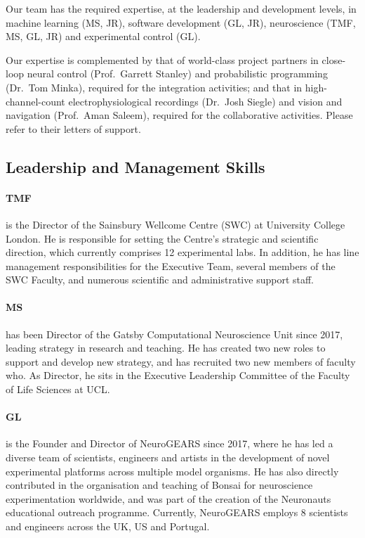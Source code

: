 Our team has the required expertise, at the leadership and development levels,
in machine learning (MS, JR), software development (GL, JR), neuroscience
(TMF, MS, GL, JR) and experimental control (GL).

Our expertise is complemented by that of world-class project partners in
close-loop neural control (Prof.~Garrett Stanley) and probabilistic programming
(Dr.~Tom Minka), required for the integration activities; and that in
high-channel-count electrophysiological recordings (Dr.~Josh Siegle) and vision
and navigation (Prof.~Aman Saleem), required for the collaborative activities.
Please refer to their letters of support.

\subsection{Leadership and Management Skills}

\paragraph{TMF} is the Director of the Sainsbury Wellcome Centre (SWC) at
University College London. He is responsible for setting the Centre’s strategic
and scientific direction, which currently comprises 12 experimental labs. In
addition, he has line management responsibilities for the Executive Team,
several members of the SWC Faculty, and numerous scientific and administrative
support staff.

\paragraph{MS} has been Director of the Gatsby Computational
Neuroscience Unit since 2017, leading strategy in research and teaching. He has
created two new roles to support and develop new strategy, and has recruited
two new members of faculty who.  As Director, he sits in the Executive
Leadership Committee of the Faculty of Life Sciences at UCL.

\paragraph{GL} is the Founder and Director of NeuroGEARS since 2017, where he has led a diverse team of scientists, engineers and artists in the development of novel experimental platforms across multiple model organisms. He has also directly contributed in the organisation and teaching of Bonsai for neuroscience experimentation worldwide, and was part of the creation of the Neuronauts educational outreach programme. Currently, NeuroGEARS employs 8 scientists and engineers across the UK, US and Portugal.

